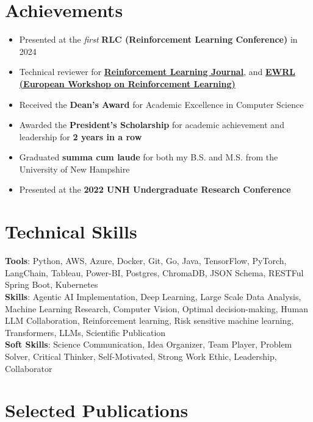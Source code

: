\documentclass[letterpaper,11pt]{article}
\begin{document}
\section{Achievements}
\begin{itemize} %
  \item Presented at the \emph{first} \textbf{RLC (Reinforcement
    Learning Conference)} in 2024
  \item Technical reviewer for
    \href{https://rlj.cs.umass.edu/}{\textbf{Reinforcement Learning
    Journal}}, and \href{https://ewrl-org.github.io/}{\textbf{EWRL
    (European Workshop on Reinforcement Learning)}}
  \item Received the \textbf{Dean's Award} for Academic Excellence in
    Computer Science
  \item Awarded the \textbf{President's Scholarship} for academic
    achievement and leadership for \textbf{2 years in a row}
  \item Graduated \textbf{summa cum laude} for both my B.S. and M.S.
    from the University of New Hampshire
  \item Presented at the \textbf{2022 UNH Undergraduate Research Conference}
\end{itemize} %
\section{Technical Skills}
\begin{itemize}[leftmargin=0.15in, label={}]
    \small{
    \item{
        \textbf{Tools}{: Python, AWS, Azure, Docker, Git, Go, Java,
          TensorFlow, PyTorch, LangChain, Tableau, Power-BI, Postgres,
        ChromaDB, JSON Schema, RESTFul Spring Boot, Kubernetes} \\[0.5em]
        \textbf{Skills}{: Agentic AI Implementation, Deep Learning,
          Large Scale Data Analysis, Machine Learning Research,
          Computer Vision, Optimal decision-making, Human LLM
          Collaboration, Reinforcement learning, Risk sensitive machine
        learning, Transformers, LLMs, Scientific Publication} \\ [0.5em]
        \textbf{Soft Skills}{: Science Communication, Idea Organizer,
          Team Player, Problem Solver, Critical Thinker,
        Self-Motivated, Strong Work Ethic, Leadership, Collaborator} \\ [0.5em]
      }
    }
\end{itemize}
\section{Selected Publications}
\resumeSubHeadingListStart
\end{document}
